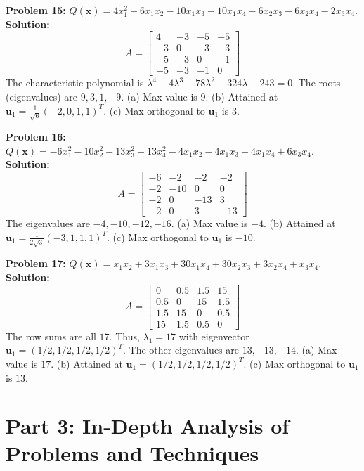 \documentclass[11pt, letterpaper]{article}
\theoremstyle{definition}
\theoremstyle{remark}
\begin{document}
\vspace{1em}
\textbf{Problem 15:} $Q(\mathbf{x}) = 4x_1^2 - 6x_1x_2 - 10x_1x_3 - 10x_1x_4 - 6x_2x_3 - 6x_2x_4 - 2x_3x_4$.
\textbf{Solution:}
\[ A = \begin{bmatrix} 4 & -3 & -5 & -5 \\ -3 & 0 & -3 & -3 \\ -5 & -3 & 0 & -1 \\ -5 & -3 & -1 & 0 \end{bmatrix} \]
The characteristic polynomial is $\lambda^4 - 4\lambda^3 - 78\lambda^2 + 324\lambda - 243 = 0$. The roots (eigenvalues) are $9, 3, 1, -9$.
(a) Max value is $9$. (b) Attained at $\mathbf{u}_1 = \frac{1}{\sqrt{6}}(-2, 0, 1, 1)^T$. (c) Max orthogonal to $\mathbf{u}_1$ is $3$.

\vspace{1em}
\textbf{Problem 16:} $Q(\mathbf{x}) = -6x_1^2 - 10x_2^2 - 13x_3^2 - 13x_4^2 - 4x_1x_2 - 4x_1x_3 - 4x_1x_4 + 6x_3x_4$.
\textbf{Solution:}
\[ A = \begin{bmatrix} -6 & -2 & -2 & -2 \\ -2 & -10 & 0 & 0 \\ -2 & 0 & -13 & 3 \\ -2 & 0 & 3 & -13 \end{bmatrix} \]
The eigenvalues are $-4, -10, -12, -16$.
(a) Max value is $-4$. (b) Attained at $\mathbf{u}_1 = \frac{1}{2\sqrt{3}}(-3, 1, 1, 1)^T$. (c) Max orthogonal to $\mathbf{u}_1$ is $-10$.

\vspace{1em}
\textbf{Problem 17:} $Q(\mathbf{x}) = x_1x_2 + 3x_1x_3 + 30x_1x_4 + 30x_2x_3 + 3x_2x_4 + x_3x_4$.
\textbf{Solution:}
\[ A = \begin{bmatrix} 0 & 0.5 & 1.5 & 15 \\ 0.5 & 0 & 15 & 1.5 \\ 1.5 & 15 & 0 & 0.5 \\ 15 & 1.5 & 0.5 & 0 \end{bmatrix} \]
The row sums are all $17$. Thus, $\lambda_1 = 17$ with eigenvector $\mathbf{u}_1 = (1/2, 1/2, 1/2, 1/2)^T$. The other eigenvalues are $13, -13, -14$.
(a) Max value is $17$. (b) Attained at $\mathbf{u}_1 = (1/2, 1/2, 1/2, 1/2)^T$. (c) Max orthogonal to $\mathbf{u}_1$ is $13$.

\newpage

\section{Part 3: In-Depth Analysis of Problems and Techniques}
\end{document}
